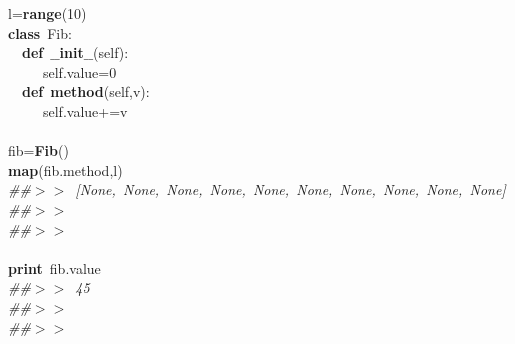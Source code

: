 \noindent
\mbox{}l=\textbf{range}(10) \\
\mbox{}\textbf{class}\ Fib: \\
\mbox{}\ \ \textbf{def}\ \textbf{$\_$$\_$init$\_$$\_$}(self): \\
\mbox{}\ \ \ \ \ self.value=0 \\
\mbox{}\ \ \textbf{def}\ \textbf{method}(self,v): \\
\mbox{}\ \ \ \ \ self.value+=v \\
\mbox{} \\
\mbox{}fib=\textbf{Fib}() \\
\mbox{}\textbf{map}(fib.method,l) \\
\mbox{}\textit{\#\#$>$$>$\ [None,\ None,\ None,\ None,\ None,\ None,\ None,\ None,\ None,\ None]} \\
\mbox{}\textit{\#\#$>$$>$\ } \\
\mbox{}\textit{\#\#$>$$>$\ } \\
\mbox{} \\
\mbox{}\textbf{print}\ fib.value \\
\mbox{}\textit{\#\#$>$$>$\ 45} \\
\mbox{}\textit{\#\#$>$$>$\ } \\
\mbox{}\textit{\#\#$>$$>$\ } \\
\mbox{} \\
\mbox{}